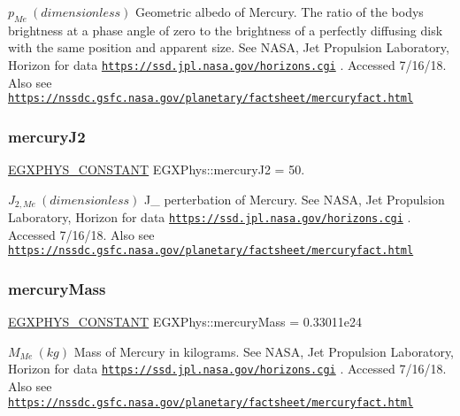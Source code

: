$ p_{Me} \ (dimensionless)$ Geometric albedo of Mercury. The ratio of the body\textquotesingle{}s brightness at a phase angle of zero to the brightness of a perfectly diffusing disk with the same position and apparent size. See N\+A\+SA, Jet Propulsion Laboratory, Horizon for data \href{https://ssd.jpl.nasa.gov/horizons.cgi}{\tt https\+://ssd.\+jpl.\+nasa.\+gov/horizons.\+cgi} . Accessed 7/16/18. Also see \href{https://nssdc.gsfc.nasa.gov/planetary/factsheet/mercuryfact.html}{\tt https\+://nssdc.\+gsfc.\+nasa.\+gov/planetary/factsheet/mercuryfact.\+html} \mbox{\label{group___e_g_x_phys-_constants-_astrophysics-_solar_system-_mercury-_bulk_ga0515d737bc0fda48122b7c195347e0bb}} 
\subsubsection{\texorpdfstring{mercury\+J2}{mercuryJ2}}
{\footnotesize\ttfamily \mbox{\hyperlink{group___e_g_x_phys-_constants-_macros_ga76980d288494ce1714c9ac68a95ba702}{E\+G\+X\+P\+H\+Y\+S\+\_\+\+C\+O\+N\+S\+T\+A\+NT}} E\+G\+X\+Phys\+::mercury\+J2 = 50.}

$ J_{2,Me} \ (dimensionless)$ J\+\_ perterbation of Mercury. See N\+A\+SA, Jet Propulsion Laboratory, Horizon for data \href{https://ssd.jpl.nasa.gov/horizons.cgi}{\tt https\+://ssd.\+jpl.\+nasa.\+gov/horizons.\+cgi} . Accessed 7/16/18. Also see \href{https://nssdc.gsfc.nasa.gov/planetary/factsheet/mercuryfact.html}{\tt https\+://nssdc.\+gsfc.\+nasa.\+gov/planetary/factsheet/mercuryfact.\+html} \mbox{\label{group___e_g_x_phys-_constants-_astrophysics-_solar_system-_mercury-_bulk_gaa73eef341356108966e9633c7a70a992}} 
\subsubsection{\texorpdfstring{mercury\+Mass}{mercuryMass}}
{\footnotesize\ttfamily \mbox{\hyperlink{group___e_g_x_phys-_constants-_macros_ga76980d288494ce1714c9ac68a95ba702}{E\+G\+X\+P\+H\+Y\+S\+\_\+\+C\+O\+N\+S\+T\+A\+NT}} E\+G\+X\+Phys\+::mercury\+Mass = 0.\+33011e24}

$M_{Me} \ (kg)$ Mass of Mercury in kilograms. See N\+A\+SA, Jet Propulsion Laboratory, Horizon for data \href{https://ssd.jpl.nasa.gov/horizons.cgi}{\tt https\+://ssd.\+jpl.\+nasa.\+gov/horizons.\+cgi} . Accessed 7/16/18. Also see \href{https://nssdc.gsfc.nasa.gov/planetary/factsheet/mercuryfact.html}{\tt https\+://nssdc.\+gsfc.\+nasa.\+gov/planetary/factsheet/mercuryfact.\+html} \mbox{\label{group___e_g_x_phys-_constants-_astrophysics-_solar_system-_mercury-_bulk_ga54c31fac4e496e9e237656a5a24d6092}} 
